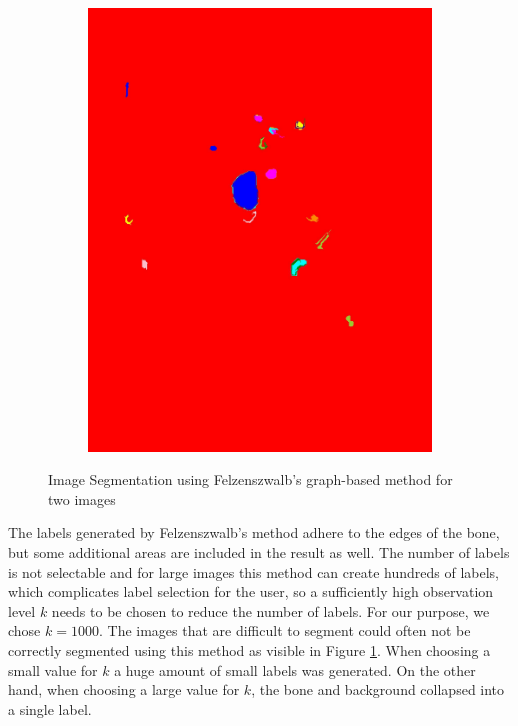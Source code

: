 \documentclass[pdftex,12pt,a4paper]{report}
\begin{document}
\begin{figure}[h]
\begin{subfigure}[b]{0.24\textwidth}
		\subcaption{}
		\label{fig:felzenszwalb:bad}
	\end{subfigure}
	\begin{subfigure}[b]{0.24\textwidth}
		\centering
		\includegraphics[width=.9\linewidth]{img/segmentation/bad/felzenszwalb/segmented.jpg}
		\subcaption*{}
		\label{}
	\end{subfigure}
	\caption{Image Segmentation using Felzenszwalb's graph-based method for two images}
	\label{fig:felzenszwalb}
\end{figure}

The labels generated by Felzenszwalb's method adhere to the edges of the bone, but some additional areas are included in the result as well. The number of labels is not selectable and for large images this method can create hundreds of labels, which complicates label selection for the user, so a sufficiently high observation level $k$ needs to be chosen to reduce the number of labels. For our purpose, we chose $k=1000$. The images that are difficult to segment could often not be correctly segmented using this method as visible in Figure \ref{fig:felzenszwalb:bad}. When choosing a small value for $k$ a huge amount of small labels was generated. On the other hand, when choosing a large value for $k$, the bone and background collapsed into a single label.
\end{document}
